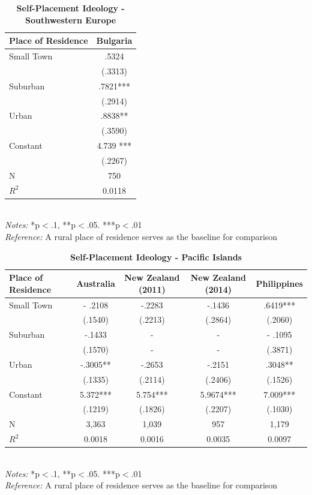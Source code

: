 \documentclass[12pt, titlepage]{article}
\newcommand\e{\emph}
\newcommand\tb{\textbf}
\begin{document}
\begin{landscape}
\begin{table}
	\centering
	\def\arraystretch{1.5}
	\caption{\tb{Self-Placement Ideology - Southwestern Europe}}
	\begin{tabulary}{\linewidth}{l c}
		\\
		\hline
		\tb{Place of Residence}& \tb{Bulgaria} \\
		\hline
		Small Town&.5324 \\
		&(.3313) \\
		Suburban& .7821*** \\
		& (.2914) \\
		Urban& .8838** \\
		& (.3590) \\
		Constant& 4.739 *** \\
		& (.2267) \\
		N& 750 \\
		$R^2$&0.0118 \\
		\hline
	\end{tabulary}
\\
\e{Notes:} *p$<$.1, **p$<$.05. ***p$<$.01 \\
\e{Reference:} A rural place of residence serves as the baseline for comparison
\label{table8}
\end{table}
\end{landscape}

\begin{landscape}
\begin{table}
	\centering
	\def\arraystretch{1.5}
	\caption{\tb{Self-Placement Ideology - Pacific Islands}}
	\begin{tabulary}{\linewidth}{l c c c c}
		\\
		\hline
		\tb{Place of Residence}&\tb{Australia}&\tb{New Zealand (2011)}&\tb{New Zealand (2014)} &\tb{Philippines}\\
		\hline
		Small Town  & - .2108  & -.2283  &-.1436 &  .6419***  \\      
		& (.1540)   & (.2213) & (.2864)  & (.2060)    \\
		Suburban  & -.1433   & -   & -    & - .1095   \\ 
		& (.1570)   & -  & -    & (.3871)       \\
		Urban  & -.3005** & -.2653  & -.2151 & .3048** \\
		& (.1335) &(.2114)   & (.2406) & (.1526)      \\
		Constant   & 5.372***   & 5.754*** & 5.9674***  & 7.009***   \\
		&(.1219)&(.1826)&(.2207)&(.1030) \\
		N 	 & 3,363   &1,039    & 957   & 1,179  \\
		$R^2$  & 0.0018   &0.0016  &0.0035  &0.0097     \\
		\hline                                       
	\end{tabulary} 
	\\
	\e{Notes:} *p$<$.1, **p$<$.05. ***p$<$.01 \\
	\e{Reference:} A rural place of residence serves as the baseline for comparison
	\label{table10}
\end{table}
\end{landscape}
\end{document}
